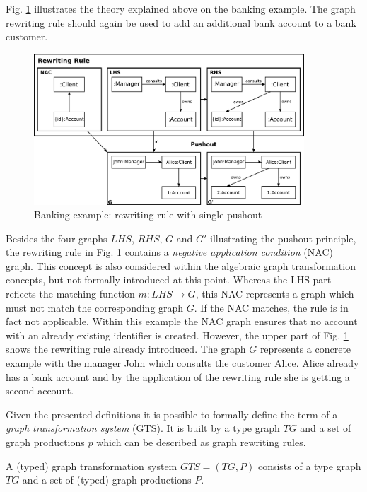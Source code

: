 \documentclass[runningheads]{llncs}
\begin{document}
\noindent
Fig. \ref{fig:banking-example-pushout} illustrates the theory explained above on the banking example. The graph rewriting rule  should again be used to add an additional bank account to a bank customer. 

\begin{figure}[H]
	\centering
	\includegraphics[width=0.9\textwidth]{banking-example-pushout}
	\caption{Banking example: rewriting rule with single pushout}
	\label{fig:banking-example-pushout}
\end{figure}

\noindent
Besides the four graphs $LHS$, $RHS$, $G$ and $G'$ illustrating the pushout principle, the rewriting rule in Fig. \ref{fig:banking-example-pushout} contains a \textit{negative application condition} (NAC) graph. This concept is also considered within the algebraic graph transformation concepts, but not formally introduced at this point. Whereas the LHS part reflects the matching function $m : LHS \to G$, this NAC represents a graph which must not match the corresponding graph $G$. If the NAC matches, the rule is in fact not applicable. Within this example the NAC graph ensures that no account with an already existing identifier is created. However, the upper part of Fig. \ref{fig:banking-example-pushout} shows the rewriting rule already introduced. The graph $G$ represents a concrete example with the manager John which consults the customer Alice. Alice already has a bank account and by the application of the rewriting rule she is getting a second account.

Given the presented definitions it is possible to formally define the term of a \textit{graph transformation system} (GTS). It is built by a type graph $TG$ and a set of graph productions $p$ which can be described as graph rewriting rules.

\begin{definition}\label{gts}
A (typed) graph transformation system $GTS = (TG,P)$ consists of a type graph $TG$ and a set of (typed) graph productions $P$.
\end{definition}
\end{document}
